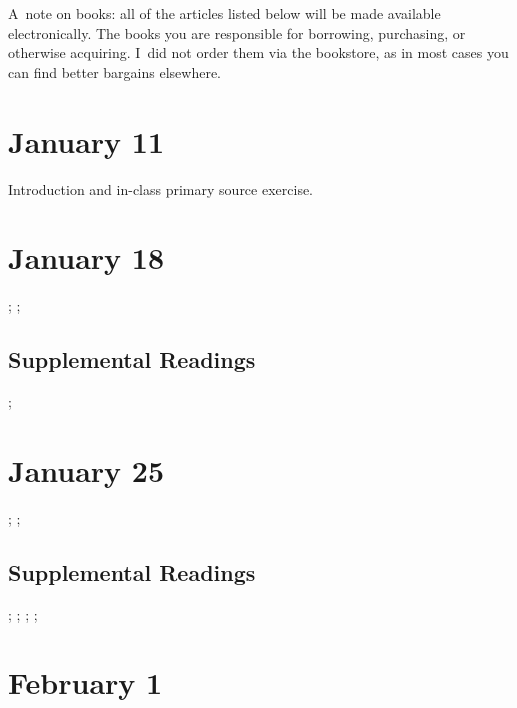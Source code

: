 \documentclass[11pt]{article}
\begin{document}
\noindent A~note on books: all of the articles listed below will be made available electronically.  The books you are responsible for borrowing, purchasing, or otherwise acquiring.  I~did not order them via the bookstore, as in most cases you can find better bargains elsewhere.

\small
\let\realeverypar\everypar
\realeverypar{\the\myeverypar\the\everypar}%
\newtoks\everypar %
\everypar{}
\newtoks\myeverypar \myeverypar{}

\myeverypar{\hangindent=1cm \small}

\section{January 11}

Introduction and in-class primary source exercise.

\cite{Turkle:1984hack}


\section{January 18}

\cite{Scott:1986ik}; \cite{Cowan:1976wda}; 
\cite{Oldenziel:1997to}

\subsection{Supplemental Readings}

\cite{Cowan:1983vm}; \cite{Lerman:1997ui}


\section{January 25}

\cite{Bray:2007cb}; \cite{Kleif:2003wg}; \cite{Fischer:1988wl}

\subsection{Supplemental Readings}

\cite{Wajcman:2000vq}; \cite{Bray:1997wl}; \cite{Edwards:1990ua}; \cite{Pirsig:1974vs}; \cite{Ullman:1997vv}

\section{February 1}
\end{document}
